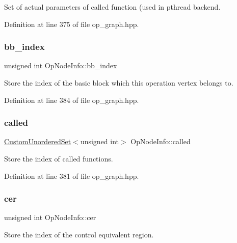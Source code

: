 Set of actual parameters of called function (used in pthread backend. 



Definition at line 375 of file op\+\_\+graph.\+hpp.

\mbox{\label{structOpNodeInfo_adf1ca07b35dbffaafe72c5b4a209d9ee}} 
\subsubsection{\texorpdfstring{bb\+\_\+index}{bb\_index}}
{\footnotesize\ttfamily unsigned int Op\+Node\+Info\+::bb\+\_\+index}



Store the index of the basic block which this operation vertex belongs to. 



Definition at line 384 of file op\+\_\+graph.\+hpp.

\mbox{\label{structOpNodeInfo_a560909ca1b3ecdb9d2e820113acb76bc}} 
\subsubsection{\texorpdfstring{called}{called}}
{\footnotesize\ttfamily \hyperlink{classCustomUnorderedSet}{Custom\+Unordered\+Set}$<$unsigned int$>$ Op\+Node\+Info\+::called}



Store the index of called functions. 



Definition at line 381 of file op\+\_\+graph.\+hpp.

\mbox{\label{structOpNodeInfo_ad609377fed2c03245d26ebfd8117371d}} 
\subsubsection{\texorpdfstring{cer}{cer}}
{\footnotesize\ttfamily unsigned int Op\+Node\+Info\+::cer}



Store the index of the control equivalent region. 



